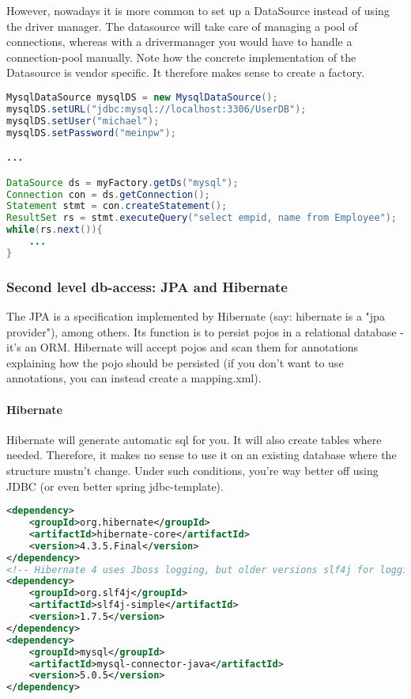 However, nowadays it is more common to set up a DataSource instead of using the driver manager. The datasource will take care of managing a pool of connections, whereas with a drivermanager you would have to handle a connection-pool manually. Note how the concrete implementation of the Datasource is vendor specific. It therefore makes sense to create a factory. 

\begin{lstlisting}[language=java]
MysqlDataSource mysqlDS = new MysqlDataSource();
mysqlDS.setURL("jdbc:mysql://localhost:3306/UserDB");
mysqlDS.setUser("michael");
mysqlDS.setPassword("meinpw");

...

DataSource ds = myFactory.getDs("mysql");
Connection con = ds.getConnection();
Statement stmt = con.createStatement();
ResultSet rs = stmt.executeQuery("select empid, name from Employee");
while(rs.next()){
    ...
}
\end{lstlisting}

\subsubsection{Second level db-access: JPA and Hibernate}
The JPA is a specification implemented by Hibernate (say: hibernate is a "jpa provider"), among others. Its function is to persist pojos in a relational database - it's an ORM. Hibernate will accept pojos and scan them for annotations explaining how the pojo should be persisted (if you don't want to use annotations, you can instead create a mapping.xml). 

\paragraph{Hibernate} Hibernate will generate automatic sql for you. It will also create tables where needed. Therefore, it makes no sense to use it on an existing database where the structure mustn't change. Under such conditions, you're way better off using JDBC (or even better spring jdbc-template). 

\begin{lstlisting}[language=xml]
<dependency>
	<groupId>org.hibernate</groupId>
	<artifactId>hibernate-core</artifactId>
	<version>4.3.5.Final</version>
</dependency>
<!-- Hibernate 4 uses Jboss logging, but older versions slf4j for logging -->
<dependency>
	<groupId>org.slf4j</groupId>
	<artifactId>slf4j-simple</artifactId>
	<version>1.7.5</version>
</dependency>
<dependency>
	<groupId>mysql</groupId>
	<artifactId>mysql-connector-java</artifactId>
	<version>5.0.5</version>
</dependency>
\end{lstlisting}

